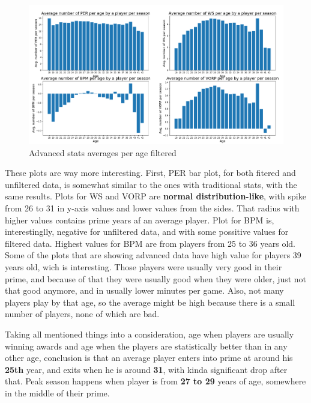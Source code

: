 \documentclass[a4paper]{article}
\begin{document}
\begin{figure}[h!]
\begin{center}
\includegraphics[scale=0.3]{advanced_stats_per_age_filtered.png}
\end{center}
\caption{Advanced stats averages per age filtered}
\label{plt:advanced_age_filtered}
\end{figure}

These plots are way more interesting. First, PER bar plot, for both fitered and unfiltered data, is somewhat similar to the ones with traditional stats, with the same results. Plots for WS and VORP are \textbf{normal distribution-like}, with spike from 26 to 31 in y-axis values and lower values from the sides. That radius with higher values contains prime years af an average player. Plot for BPM is, interestinglly, negative for unfiltered data, and with some possitive values for filtered data. Highest values for BPM are from players from 25 to 36 years old. Some of the plots that are showing advanced data have high value for players 39 years old, wich is interesting. Those players were usually very good in their prime, and because of that they were usually good when they were older, just not that good anymore, and in usually lower minutes per game. Also, not many players play by that age, so the average might be high because there is a small number of players, none of which are bad.

Taking all mentioned things into a consideration, age when players are usually winning awards and age when the players are statistically better than in any other age, conclusion is that an average player enters into prime at around his \textbf{25th} year, and exits when he is around \textbf{31}, with kinda significant drop after that. Peak season happens when player is from \textbf{27 to 29} years of age, somewhere in the middle of their prime.
\end{document}
